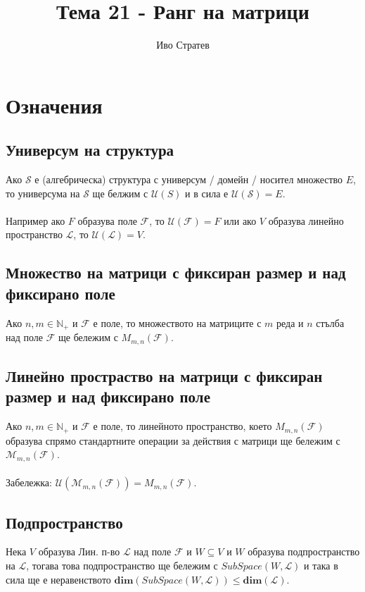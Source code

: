 \documentclass[a4paper,9pt]{extarticle}
\author{Иво Стратев}
\title{Тема 21 - Ранг на матрици}
\newcommand{\Nat}{\mathbb{N}}
\newcommand{\F}{\mathcal{F}}
\newcommand{\Uni}{\mathcal{U}}
\newcommand{\dimention}{\mathbf{dim}}
\begin{document}
\maketitle

\section{Означения}

\subsection{Универсум на структура}
Ако \(\mathcal{S}\) е (алгебрическа) структура с универсум / домейн / носител множество \(E\), то универсума на \(\mathcal S\) ще белжим с \(\Uni(S)\) и в сила е \(\Uni(\mathcal S) = E\). \\\\
Например ако \(F\) образува поле \(\F\), то \(\Uni(\F) = F\)
или ако \(V\) образува линейно пространство \(\mathcal L\), то \(\Uni(\mathcal L) = V\).

\subsection{Множество на матрици с фиксиран размер и над фиксирано поле}
Ако \(n, m \in \Nat_+\) и \(\F\) е поле, то множеството на матриците с \(m\) реда и \(n\) стълба над поле \(\F\) ще бележим с \(M_{m, n}(\F)\).

\subsection{Линейно простраство на матрици с фиксиран размер и над фиксирано поле}
Ако \(n, m \in \Nat_+\) и \(\F\) е поле, то линейното пространство, което \(M_{m, n}(\F)\) образува спрямо стандартните операции за действия с матрици ще бележим с \(\mathcal{M}_{m, n}(\F)\). \\\\
Забележка: \(\Uni(\mathcal{M}_{m, n}(\F)) = M_{m, n}(\F)\).

\subsection{Подпространство}
Нека \(V\) образува Лин. п-во \(\mathcal L\) над поле \(\F\) и \(W \subseteq V\) и \(W\) образува подпространство на \(\mathcal L\), тогава това подпространство ще бележим с \(SubSpace(W, \mathcal L)\)
и така в сила ще е неравенството \(\dimention(SubSpace(W, \mathcal L)) \leq \dimention(\mathcal L)\).
\end{document}
